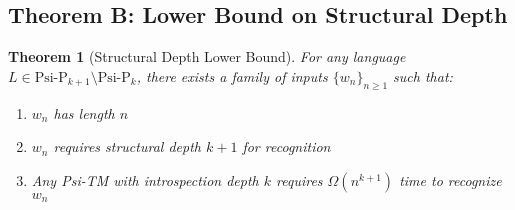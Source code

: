 \documentclass[11pt]{article}
\newtheorem{theorem}{Theorem}
\begin{document}
\subsection{Theorem B: Lower Bound on Structural Depth}

\begin{theorem}[Structural Depth Lower Bound]
\label{thm:structural-depth-lower-bound}
For any language $L \in \text{Psi-P}_{k+1} \setminus \text{Psi-P}_k$, there exists a family of inputs $\{w_n\}_{n \geq 1}$ such that:
\begin{enumerate}
\item $w_n$ has length $n$
\item $w_n$ requires structural depth $k+1$ for recognition
\item Any Psi-TM with introspection depth $k$ requires $\Omega(n^{k+1})$ time to recognize $w_n$
\end{enumerate}
\end{theorem}
\end{document}
